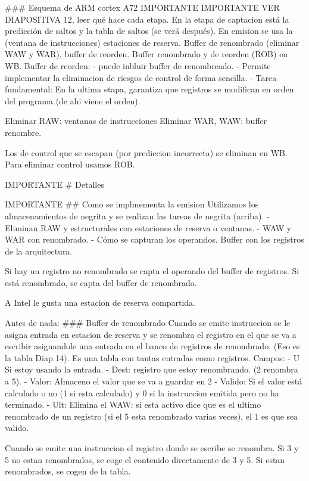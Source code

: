 ### Esquema de ARM cortex A72
IMPORTANTE
IMPORTANTE
VER DIAPOSITIVA 12, leer qué hace cada etapa.
En la etapa de captacion está la predicción de saltos y la tabla de saltos (se verá después).
En emision se usa la (ventana de instrucciones) estaciones de reserva. Buffer de renombrado (eliminar WAW y WAR), buffer de reorden.
Buffer renombrado y de reorden (ROB) en WB.
Buffer de reorden: 
- puede inbluir buffer de renombreado.
- Permite implementar la eliminacion de riesgos de control de forma sencilla.
- Tarea fundamental: En la ultima etapa, garantiza que registros se modifican en orden del programa (de ahi viene el orden).

Eliminar RAW: ventanas de instrucciones 
Eliminar WAR, WAW: buffer renombre.

Los de control que se escapan (por prediccion incorrecta) se eliminan en WB.
Para eliminar control usamos ROB.



IMPORTANTE
# Detalles

IMPORTANTE
## Como se implmementa la emision
Utilizamos los almacenamientos de negrita y se realizan las tareas de negrita (arriba).
- Eliminan RAW y estructurales con estaciones de reserva o ventanas.
- WAW y WAR con renombrado.
- Cómo se capturan los operandos. Buffer con los registros de la arquitectura.

Si hay un registro no renombrado se capta el operando del buffer de registros.
Si está renombrado, se capta del buffer de renombrado.




A Intel le gusta una estacion de reserva compartida.

Antes de nada:
### Buffer de renombrado
Cuando se emite instruccion se le asigna entrada en estacion de reserva y se renombra el registro en el que se va a escribir asignandole una entrada en el banco de registros de renombrado. (Eso es la tabla Diap 14). Es una tabla con tantas entradas como registros. Campos:
- U Si estoy usando la entrada.
- Dest: registro que estoy renombrando. (2 renombra a 5).
- Valor: Almaceno el valor que se va a guardar en 2
- Valido: Si el valor está calculado o no (1 si esta calculado) y 0 si la instruccion emitida pero no ha terminado.
- Ult: Elimina el WAW: si esta activo dice que es el ultimo renombrado de un registro (si el 5 esta renombrado varias veces), el 1 es que sea valido.

Cuando se emite una instruccion el registro donde se escribe se renombra.
Si 3 y 5 no estan renombrados, se coge el contenido directamente de 3 y 5. Si estan renombrados, se cogen de la tabla.

